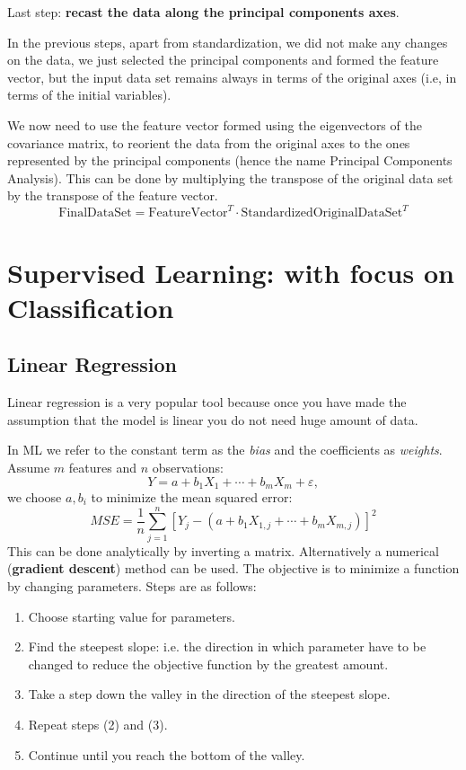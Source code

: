 Last step: \textbf{recast the data along the principal components axes}.

In the previous steps, apart from standardization, we did not make any changes on the data, we just selected the principal components and formed the feature vector, but the input data set remains always in terms of the original axes (i.e, in terms of the initial variables).

We now need to use the feature vector formed using the eigenvectors of the covariance matrix, to reorient the data from the original axes to the ones represented by the principal components (hence the name Principal Components Analysis). This can be done by multiplying the transpose of the original data set by the transpose of the feature vector.
\begin{equation*}
    \text{FinalDataSet} =\text{FeatureVector}^{T} \cdot \text{StandardizedOriginalDataSet}^{T}
\end{equation*}
\section{Supervised Learning: with focus on Classification}
\subsection{Linear Regression}

Linear regression is a very popular tool because once you have made the assumption that the model is linear you do not need huge amount of data.

In ML we refer to the constant term as the \textit{bias} and the coefficients as \textit{weights}. Assume $m$ features and $n$ observations:
\begin{equation*}
    Y=a+b_{1} X_{1} +\cdots +b_{m} X_{m} +\varepsilon ,
\end{equation*}
we choose $a,b_{i}$ to minimize the mean squared error:
\begin{equation*}
    MSE=\frac{1}{n}\sum _{j=1}^{n}[ Y_{j} -( a+b_{1} X_{1,j} +\cdots +b_{m} X_{m,j})]^{2}
\end{equation*}
This can be done analytically by inverting a matrix. Alternatively a numerical (\textbf{gradient descent}) method can be used. The objective is to minimize a function by changing parameters. Steps are as follows:
\begin{enumerate}
    \item Choose starting value for parameters.
    \item Find the steepest slope: i.e. the direction in which parameter have to be changed to reduce the objective function by the greatest amount.
    \item Take a step down the valley in the direction of the steepest slope.
    \item Repeat steps (2) and (3).
    \item Continue until you reach the bottom of the valley.
\end{enumerate}


